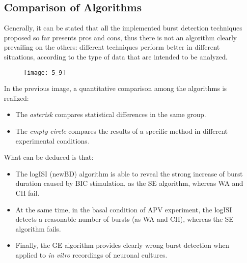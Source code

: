 \subsection{Comparison of Algorithms}
Generally, it can be stated that all the implemented burst detection techniques proposed so
far presents pros and cons, thus there is not an algorithm clearly prevailing on the others:
different techniques perform better in different situations, according to the type of data
that are intended to be analyzed.
\begin{figure}[H]
    \texttt{[image: 5\_9]}
    \centering
\end{figure}
In the previous image, a quantitative comparison among the algorithms is realized:
\begin{itemize}
    \item The \textit{asterisk} compares statistical differences in the same group.
    \item The \textit{empty circle} compares the results of a specific method in
          different experimental conditions.
\end{itemize}
What can be deduced is that:
\begin{itemize}
    \item The logISI (newBD) algorithm is able to reveal the strong increase of burst
          duration caused by BIC stimulation, as the SE algorithm, whereas WA and CH fail.
    \item At the same time, in the basal condition of APV experiment, the logISI detects
          a reasonable number of bursts (as WA and CH), whereas the SE algorithm fails.
    \item Finally, the GE algorithm provides clearly wrong burst detection when applied to
          \textit{in vitro} recordings of neuronal cultures.
\end{itemize}